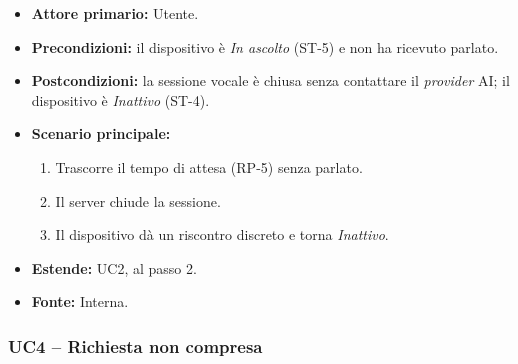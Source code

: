 \documentclass[12pt,a4paper]{article}
\newcommand{\tightlist}{\setlength{\itemsep}{1pt}\setlength{\parskip}{0pt}}
\begin{document}
\begin{itemize}

\tightlist

\item \textbf{Attore primario:} Utente.

\item \textbf{Precondizioni:} il dispositivo è \emph{In ascolto} (ST-5) e non ha ricevuto parlato.

\item \textbf{Postcondizioni:} la sessione vocale è chiusa senza contattare il \emph{provider} AI; il dispositivo è \emph{Inattivo} (ST-4).

\item \textbf{Scenario principale:}

\begin{enumerate}

\tightlist

\item Trascorre il tempo di attesa (RP-5) senza parlato.

\item Il server chiude la sessione.

\item Il dispositivo dà un riscontro discreto e torna \emph{Inattivo}.

\end{enumerate}

\item \textbf{Estende:} UC2, al passo 2.

\item \textbf{Fonte:} Interna.

\end{itemize}



\subsubsection{UC4 -- Richiesta non compresa}
\end{document}
